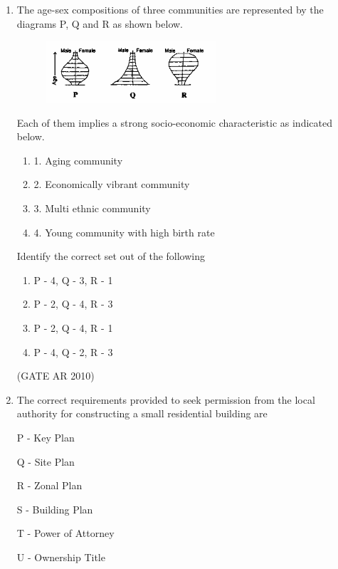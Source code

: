 \documentclass[journal]{IEEEtran}
\begin{document}
\begin{enumerate}
\item The age-sex compositions of three communities are represented by the diagrams P, Q and R as shown below.

\begin{figure}[H]
\centering
\includegraphics[width=0.6\textwidth]{Fig 7.png}
\caption{}
\label{fig:question40}
\end{figure}

Each of them implies a strong socio-economic characteristic as indicated below.

\begin{multicols}{2}
\begin{enumerate}
\item 1. Aging community
\item 2. Economically vibrant community
\item 3. Multi ethnic community
\item 4. Young community with high birth rate
\end{enumerate}
\end{multicols}

Identify the correct set out of the following
\begin{multicols}{2}
\begin{enumerate}
\item P - 4, Q - 3, R - 1
\item P - 2, Q - 4, R - 3
\item P - 2, Q - 4, R - 1
\item P - 4, Q - 2, R - 3
\end{enumerate}
\end{multicols}
\hfill (GATE AR 2010)

\item The correct requirements provided to seek permission from the local authority for constructing a small residential building are

P - Key Plan

Q - Site Plan

R - Zonal Plan

S - Building Plan

T - Power of Attorney

U - Ownership Title


\end{enumerate}
\end{document}
